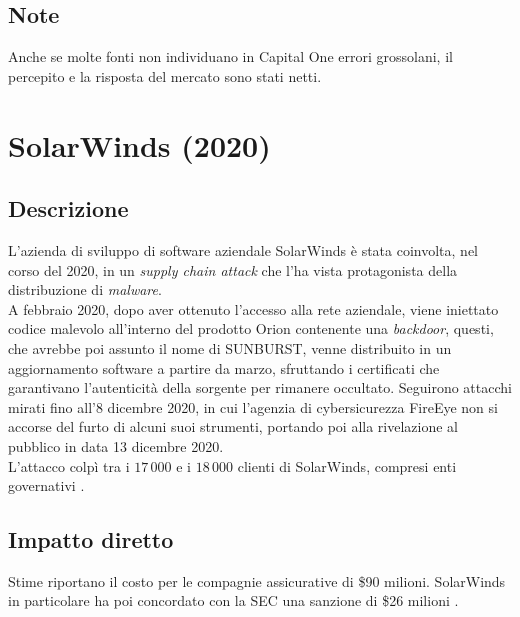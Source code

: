 \documentclass[12pt,a4paper,openright,twoside]{report}
\begin{document}
\subsection{Note}
Anche se molte fonti non individuano in Capital One errori grossolani, il percepito e la risposta del mercato sono stati netti.\\
\section{SolarWinds (2020)}
\subsection{Descrizione}
L'azienda di sviluppo di software aziendale SolarWinds \`e stata coinvolta, nel corso del 2020, in un \textit{supply chain attack} che l'ha vista protagonista della distribuzione di \textit{malware}.\\
A febbraio 2020, dopo aver ottenuto l'accesso alla rete aziendale, viene iniettato codice malevolo all'interno del prodotto Orion contenente una \textit{backdoor}, questi, che avrebbe poi assunto il nome di SUNBURST, venne distribuito in un aggiornamento software a partire da marzo, sfruttando i certificati che garantivano l'autenticit\`a della sorgente per rimanere occultato. Seguirono attacchi mirati fino all'8 dicembre 2020, in cui l'agenzia di cybersicurezza FireEye non si accorse del furto di alcuni suoi strumenti, portando poi alla rivelazione al pubblico in data 13 dicembre 2020.\\
L'attacco colp\`i tra i $17\,000$ e i $18\,000$ clienti di SolarWinds, compresi enti governativi \cite{SolarWinds_lessons}\cite{SolarWinds_analysis}\cite{SolarWinds_conference}.\\

\subsection{Impatto diretto}
Stime riportano il costo per le compagnie assicurative di \$90 milioni. SolarWinds in particolare ha poi concordato con la SEC una sanzione di \$26 milioni \cite{SolarWinds_2022_SEC}. 
\end{document}
